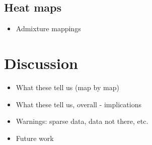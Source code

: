 \documentclass[11pt]{article}
\begin{document}
\subsection{Heat maps}
\begin{itemize}
\item Admixture mappings
\end{itemize}

\section{Discussion}
\begin{itemize}
\item What these tell us (map by map)
\item What these tell us, overall - implications
\item Warnings: sparse data, data not there, etc. 
\item Future work 
%
\end{itemize}



\end{document}
